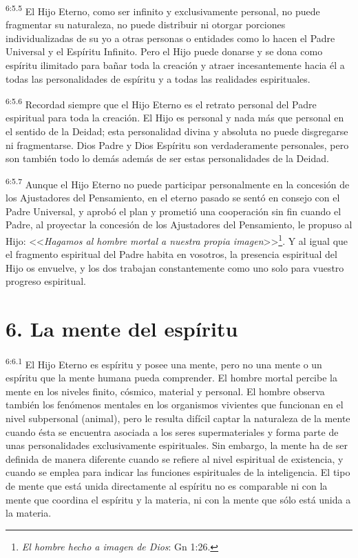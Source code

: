 \par
\textsuperscript{6:5.5} El Hijo Eterno, como ser infinito y exclusivamente personal, no puede fragmentar su naturaleza, no puede distribuir ni otorgar porciones individualizadas de su yo a otras personas o entidades como lo hacen el Padre Universal y el Espíritu Infinito. Pero el Hijo puede donarse y se dona como espíritu ilimitado para bañar toda la creación y atraer incesantemente hacia él a todas las personalidades de espíritu y a todas las realidades espirituales.

\par
\textsuperscript{6:5.6} Recordad siempre que el Hijo Eterno es el retrato personal del Padre espiritual para toda la creación. El Hijo es personal y nada más que personal en el sentido de la Deidad; esta personalidad divina y absoluta no puede disgregarse ni fragmentarse. Dios Padre y Dios Espíritu son verdaderamente personales, pero son también todo lo demás además de ser estas personalidades de la Deidad.

\par
\textsuperscript{6:5.7} Aunque el Hijo Eterno no puede participar personalmente en la concesión de los Ajustadores del Pensamiento, en el eterno pasado se sentó en consejo con el Padre Universal, y aprobó el plan y prometió una cooperación sin fin cuando el Padre, al proyectar la concesión de los Ajustadores del Pensamiento, le propuso al Hijo: <<\textit{Hagamos al hombre mortal a nuestra propia imagen}>>\footnote{\textit{El hombre hecho a imagen de Dios}: Gn 1:26.}. Y al igual que el fragmento espiritual del Padre habita en vosotros, la presencia espiritual del Hijo os envuelve, y los dos trabajan constantemente como uno solo para vuestro progreso espiritual.

\section*{6. La mente del espíritu}
\par
\textsuperscript{6:6.1} El Hijo Eterno es espíritu y posee una mente, pero no una mente o un espíritu que la mente humana pueda comprender. El hombre mortal percibe la mente en los niveles finito, cósmico, material y personal. El hombre observa también los fenómenos mentales en los organismos vivientes que funcionan en el nivel subpersonal (animal), pero le resulta difícil captar la naturaleza de la mente cuando ésta se encuentra asociada a los seres supermateriales y forma parte de unas personalidades exclusivamente espirituales. Sin embargo, la mente ha de ser definida de manera diferente cuando se refiere al nivel espiritual de existencia, y cuando se emplea para indicar las funciones espirituales de la inteligencia. El tipo de mente que está unida directamente al espíritu no es comparable ni con la mente que coordina el espíritu y la materia, ni con la mente que sólo está unida a la materia.

